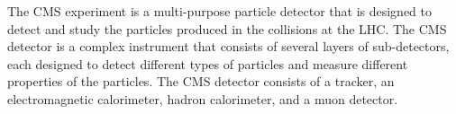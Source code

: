 The CMS experiment \cite{CMS:2008xjf} is a multi-purpose particle detector that is designed to detect and study the particles produced in the collisions at the LHC. The CMS detector is a complex instrument that consists of several layers of sub-detectors, each designed to detect different types of particles and measure different properties of the particles. The CMS detector consists of a tracker, an electromagnetic calorimeter, hadron calorimeter, and a muon detector. 

\begin{itemize}





\end{itemize}
